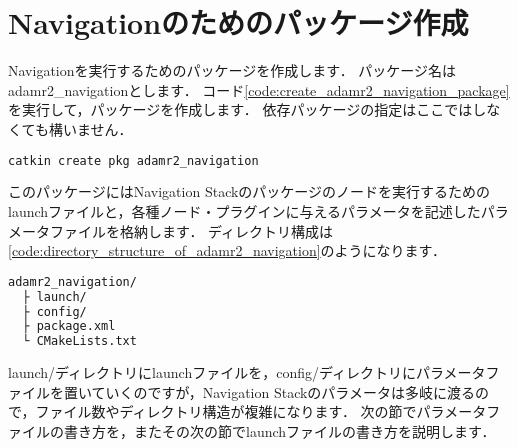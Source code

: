 \documentclass[{../../master}]{subfiles}
\begin{document}
\section{Navigationのためのパッケージ作成}

Navigationを実行するためのパッケージを作成します．
パッケージ名は\textsf{adamr2\_navigation}とします．
コード\ref{code:create_adamr2_navigation_package}を実行して，パッケージを作成します．
依存パッケージの指定はここではしなくても構いません．

\begin{lstlisting}[language=sh, label=code:create_adamr2_navigation_package, caption=Create \textsf{adamr2\_navigation} Package]
catkin create pkg adamr2_navigation
\end{lstlisting}

このパッケージにはNavigation Stackのパッケージのノードを実行するためのlaunchファイルと，各種ノード・プラグインに与えるパラメータを記述したパラメータファイルを格納します．
ディレクトリ構成は\ref{code:directory_structure_of_adamr2_navigation}のようになります．

\begin{lstlisting}[language=sh, caption=Directory Structure of \textsf{adamr2\_navigation}, label=code:directory_structure_of_adamr2_navigation]
adamr2_navigation/
  ├ launch/
  ├ config/
  ├ package.xml
  └ CMakeLists.txt
\end{lstlisting}

\textsf{launch/}ディレクトリにlaunchファイルを，\textsf{config/}ディレクトリにパラメータファイルを置いていくのですが，Navigation Stackのパラメータは多岐に渡るので，ファイル数やディレクトリ構造が複雑になります．
次の節でパラメータファイルの書き方を，またその次の節でlaunchファイルの書き方を説明します．
\end{document}
